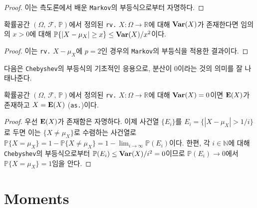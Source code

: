 \begin{proof}
    이는 측도론에서 배운 \texttt{Markov}의 부등식으로부터 자명하다.
\end{proof}

\begin{corollary}
    확률공간 $(\Omega,\,\mathcal{F},\,\mathbb{P})$에서 정의된 \texttt{rv.} $X:\Omega\to\mathbb{R}$에 대해 $\mathbf{Var}(X)$가 존재한다면 임의의 $x>0$에 대해 $\mathbb{P}\{|X-\mu_X|\geq x\}\leq\mathbf{Var}(X)/x^2$이다.
\end{corollary}

\begin{proof}
    이는 \texttt{rv.} $X-\mu_X$에 $p=2$인 경우의 \texttt{Markov}의 부등식을 적용한 결과이다.
\end{proof}

다음은 \texttt{Chebyshev}의 부등식의 기초적인 응용으로, 분산이 $0$이라는 것의 의미를 잘 나태나준다.

\begin{proposition}
    확률공간 $(\Omega,\,\mathcal{F},\,\mathbb{P})$에서 정의된 \texttt{rv.} $X:\Omega\to\mathbb{R}$에 대해 $\mathbf{Var}(X)=0$이면 $\mathbf{E}(X)$가 존재하고 $X=\mathbf{E}(X)$ (\texttt{as.})이다.
\end{proposition}

\begin{proof}
    우선 $\mathbf{E}(X)$가 존재함은 자명하다. 이제 사건열 $\{E_i\}$를 $E_i=\{|X-\mu_X|>1/i\}$로 두면 이는 $\{X\ne\mu_X\}$로 수렴하는 사건열로 $\mathbb{P}\{X=\mu_X\}=1-\mathbb{P}\{X\ne\mu_X\}=1-\lim_{i\to\infty}\mathbb{P}(E_i)$이다. 한편, 각 $i\in\mathbb{N}$에 대해 \texttt{Chebyshev}의 부등식으로부터 $\mathbb{P}(E_i)\leq\mathbf{Var}(X)/i^2=0$이므로 $\mathbb{P}(E_i)\to0$에서 $\mathbb{P}\{X=\mu_X\}=1$임을 안다.
\end{proof}

\section{Moments}

